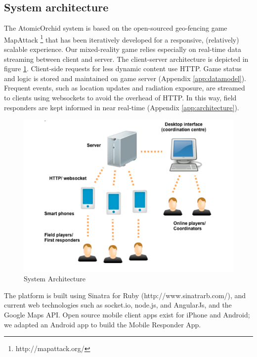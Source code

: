 \subsection{System architecture}
The AtomicOrchid system is based on the open-sourced geo-fencing game MapAttack \footnote{http://mapattack.org/} that has been iteratively developed for a responsive, (relatively) scalable experience. Our mixed-reality game relies especially on real-time data streaming between client and server. The client-server architecture is depicted in figure \ref{fig:sysArchitecture}. Client-side requests for less dynamic content use HTTP. Game status and logic is stored and maintained on game server (Appendix \ref{app:datamodel}). Frequent events, such as location updates and radiation exposure, are streamed to clients using websockets to avoid the overhead of HTTP. In this way, field responders are kept informed in near real-time (Appendix \ref{app:architecture}).  \\

\begin{figure}[h]
  \centering
  \includegraphics[width=1\textwidth]{img/approach/systemArchitecture}
  \caption{System Architecture}
  \label{fig:sysArchitecture}
\end{figure}

The platform is built using Sinatra for Ruby (http://www.sinatrarb.com/), and current web technologies such as socket.io, node.js, and AngularJs, and the Google Maps API. Open source mobile client apps exist for iPhone and Android; we adapted an Android app to build the Mobile Responder App.\\


